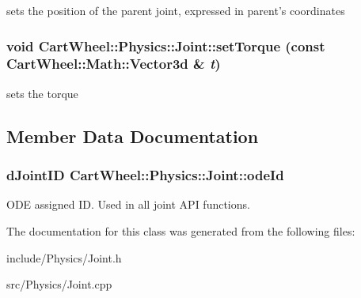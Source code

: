 \label{classCartWheel_1_1Physics_1_1Joint_a3444214c6968a6823ba8de8f4a6082c0}
sets the position of the parent joint, expressed in parent's coordinates \hypertarget{classCartWheel_1_1Physics_1_1Joint_a2fb769c24ce509160bccb2358aa459f6}{
\subsubsection[{setTorque}]{\setlength{\rightskip}{0pt plus 5cm}void CartWheel::Physics::Joint::setTorque (const {\bf CartWheel::Math::Vector3d} \& {\em t})}}
\label{classCartWheel_1_1Physics_1_1Joint_a2fb769c24ce509160bccb2358aa459f6}
sets the torque 

\subsection{Member Data Documentation}
\hypertarget{classCartWheel_1_1Physics_1_1Joint_a682f00fec8fa70dd2f9d583c94e141cc}{
\subsubsection[{odeId}]{\setlength{\rightskip}{0pt plus 5cm}dJointID {\bf CartWheel::Physics::Joint::odeId}}}
\label{classCartWheel_1_1Physics_1_1Joint_a682f00fec8fa70dd2f9d583c94e141cc}
ODE assigned ID. Used in all joint API functions. 

The documentation for this class was generated from the following files:\begin{DoxyCompactItemize}
\item 
include/Physics/Joint.h\item 
src/Physics/Joint.cpp\end{DoxyCompactItemize}
